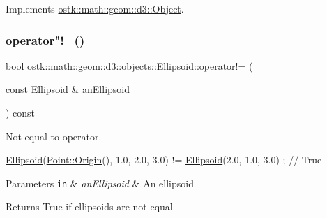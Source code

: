 Implements \hyperlink{classostk_1_1math_1_1geom_1_1d3_1_1_object_a271a1964cd208be85ce9a0a429395ad8}{ostk\+::math\+::geom\+::d3\+::\+Object}.

\mbox{\label{classostk_1_1math_1_1geom_1_1d3_1_1objects_1_1_ellipsoid_aaeed509e3703368fe9f0513d5807f9cb}} 
\subsubsection{\texorpdfstring{operator"!=()}{operator!=()}}
{\footnotesize\ttfamily bool ostk\+::math\+::geom\+::d3\+::objects\+::\+Ellipsoid\+::operator!= (\begin{DoxyParamCaption}\item[{const \hyperlink{classostk_1_1math_1_1geom_1_1d3_1_1objects_1_1_ellipsoid}{Ellipsoid} \&}]{an\+Ellipsoid }\end{DoxyParamCaption}) const}



Not equal to operator. 


\begin{DoxyCode}
\hyperlink{classostk_1_1math_1_1geom_1_1d3_1_1objects_1_1_ellipsoid_acd84276f65a14db12623402a411712b7}{Ellipsoid}(\hyperlink{classostk_1_1math_1_1geom_1_1d3_1_1objects_1_1_point_a079c199f08b015d456d02728a71b534c}{Point::Origin}(), 1.0, 2.0, 3.0) != \hyperlink{classostk_1_1math_1_1geom_1_1d3_1_1objects_1_1_ellipsoid_acd84276f65a14db12623402a411712b7}{Ellipsoid}(2.0, 1.0, 3.0) ; \textcolor{comment}{//
       True}
\end{DoxyCode}



\begin{DoxyParams}[1]{Parameters}
\mbox{\tt in}  & {\em an\+Ellipsoid} & An ellipsoid \\
\hline
\end{DoxyParams}
\begin{DoxyReturn}{Returns}
True if ellipsoids are not equal 
\end{DoxyReturn}
\mbox{\label{classostk_1_1math_1_1geom_1_1d3_1_1objects_1_1_ellipsoid_add7aa81a702b745d73f44b81359ecc4b}} 
